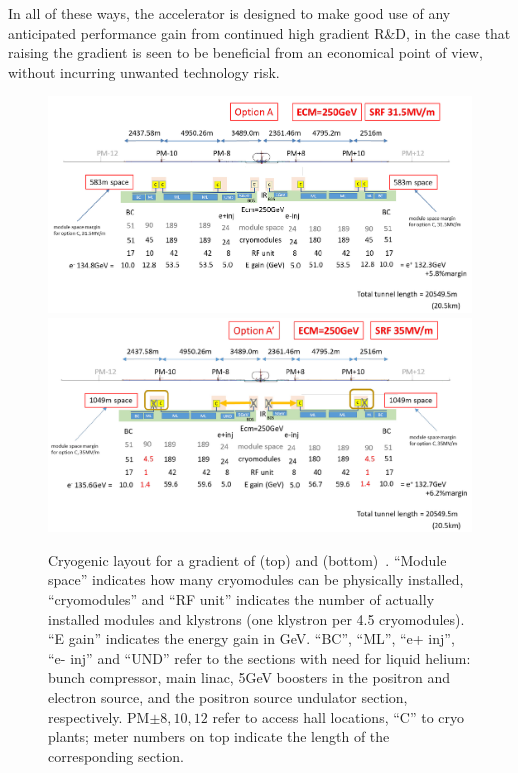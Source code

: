 In all of these ways, the accelerator is designed to make good use of any anticipated performance gain from continued high gradient R\&D,  in the case that raising the gradient is
seen to be  beneficial from an economical point of view, without incurring unwanted technology risk.

\begin{figure}[htbp]
   \includegraphics[width=\hsize]{chapters/figures/arxiv-1711-00568-fig-3-4}
   \includegraphics[width=\hsize]{chapters/figures/arxiv-1711-00568-fig-3-7}
\caption{Cryogenic layout for a gradient of  (top) and  (bottom)~\cite{Evans:2017rvt}.
``Module space'' indicates how many cryomodules can be physically installed, ``cryomodules'' and ``RF unit'' indicates the number of actually installed modules and klystrons (one klystron per 4.5 cryomodules). ``E gain'' indicates the energy gain in GeV. ``BC'', ``ML'', ``e+ inj'', ``e- inj'' and ``UND'' refer to the sections with need for liquid helium: bunch compressor, main linac, 5GeV boosters in the positron and electron source, and the positron source undulator section, respectively. PM$\pm8, 10, 12$ refer to access hall locations, ``C'' to cryo plants; meter numbers on top indicate the length of the corresponding section.}
\label{fig:ml-cryo-opta}
\end{figure}



